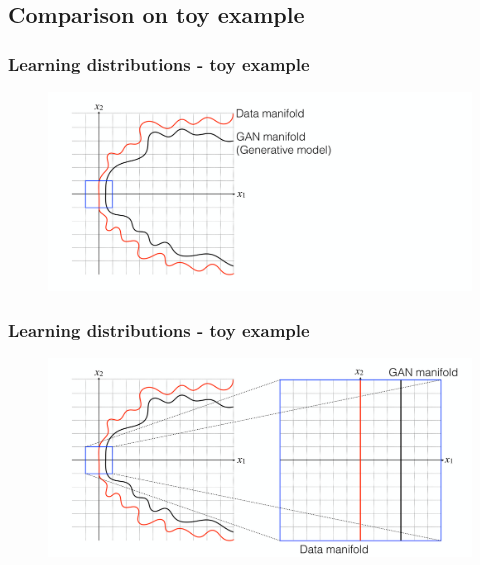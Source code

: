 \documentclass{Bredelebeamer}
\begin{document}
\subsection{Comparison on toy example}
\begin{frame}
	\frametitle{Learning distributions - toy example}
	\begin{figure}[h!]
		\centering
		\includegraphics[width=\textwidth]{data_gan_manifold.png}
	\end{figure}
\end{frame}


\begin{frame}
	\frametitle{Learning distributions - toy example}
	\begin{figure}[h!]
		\centering
		\includegraphics[width=\textwidth]{data_gan_manifold_zoom.png}
	\end{figure}
\end{frame}
\end{document}
